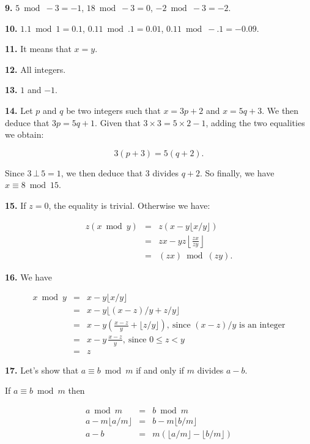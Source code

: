 \documentclass[a4paper,12pt]{article}
\newcommand{\newpar}[1]{\bigskip \noindent \textbf{#1.}}
\begin{document}
\newpar{9} $5 \bmod -3 = -1$, $18 \bmod -3 = 0$, $-2 \bmod -3 = -2$.

\newpar{10} $1.1 \bmod 1 = 0.1$, $0.11 \bmod .1 = 0.01$, $0.11 \bmod
-.1 = - 0.09$.

\newpar{11} It means that $x = y$.

\newpar{12} All integers.

\newpar{13} $1$ and $-1$.

\newpar{14} Let $p$ and $q$ be two integers such that $x = 3 p + 2$
and $x = 5 q + 3$.  We then deduce that $3p = 5q + 1$. Given that
$3\times 3 = 5 \times 2 - 1$, adding the two equalities we obtain:

\[ 3(p+3) = 5(q+2) .\]

Since $3\,\bot\,5 = 1$, we then deduce that $3$ divides
$q+2$. So finally, we have $x \equiv 8 \bmod{15}$.

\newpar{15} If $z = 0$, the equality is trivial.  Otherwise we have:

\begin{eqnarray*}
  z(x \bmod y) &=& z \left( x - y \lfloor x/y\rfloor \right) \\
  &=& zx - yz \left\lfloor\frac{zx}{zy}\right\rfloor \\
  &=& (zx) \bmod (zy).
\end{eqnarray*}

\newpar{16}  We have

\begin{eqnarray*}
  x \bmod y &=& x - y \lfloor x/y \rfloor \\
  &=& x - y \lfloor (x - z)/y + z/y\rfloor \\
  &=& x - y \left(\frac{x-z}{y} + \lfloor z/y\rfloor
  \right),\ \mbox{since $(x - z)/y$ is an integer} \\
  &=& x - y\,\frac{x-z}{y},\ \mbox{since $0 \le z < y$} \\
  &=& z
\end{eqnarray*}

\newpar{17} Let's show that $a \equiv b \bmod m$ if and only if $m$
divides $a - b$.

If $a \equiv b \bmod m$ then

\begin{eqnarray*}
  a \bmod m &=& b \bmod m \\
  a - m \lfloor a/m\rfloor &=& b - m \lfloor b/m\rfloor \\
  a - b &=& m(\lfloor a/m\rfloor - \lfloor b/m\rfloor)
\end{eqnarray*}
\end{document}
